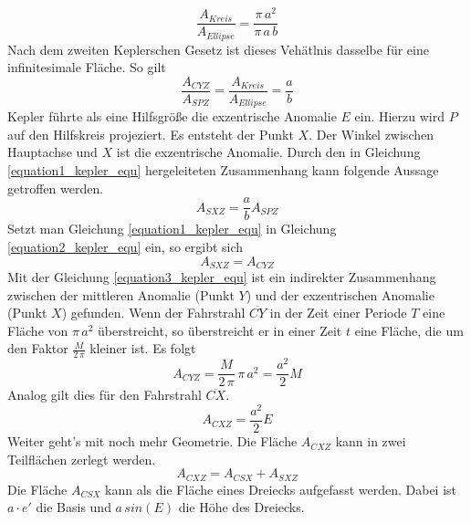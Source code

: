\begin{equation}
	\frac{A_{Kreis}}{A_{Ellipse}}=\frac{\pi\,a^2}{\pi\,a\,b}
\end{equation}
Nach dem zweiten Keplerschen Gesetz ist dieses Vehätlnis dasselbe für eine infinitesimale Fläche. So gilt
\begin{equation}
	\frac{A_{CYZ}}{A_{SPZ}}=\frac{A_{Kreis}}{A_{Ellipse}}=\frac{a}{b}
	\label{equation1_kepler_equ}
\end{equation}
\newpar
Kepler führte als eine Hilfsgröße die exzentrische Anomalie \ensuremath{E} ein. Hierzu wird \ensuremath{P} auf den Hilfskreis projeziert. Es entsteht der Punkt \ensuremath{X}. Der Winkel zwischen Hauptachse und \ensuremath{X} ist die exzentrische Anomalie. Durch den in Gleichung \ref{equation1_kepler_equ} hergeleiteten Zusammenhang kann folgende Aussage getroffen werden. 
\begin{equation}
	A_{SXZ}=\frac{a}{b}A_{SPZ}	
	\label{equation2_kepler_equ}
\end{equation}  
Setzt man Gleichung \ref{equation1_kepler_equ} in Gleichung \ref{equation2_kepler_equ} ein, so ergibt sich
\begin{equation}
	A_{SXZ}=A_{CYZ}	
	\label{equation3_kepler_equ}
\end{equation}
Mit der Gleichung \ref{equation3_kepler_equ} ist ein indirekter Zusammenhang zwischen der mittleren Anomalie (Punkt \ensuremath{Y}) und der exzentrischen Anomalie (Punkt \ensuremath{X}) gefunden. Wenn der Fahrstrahl \ensuremath{\overline{CY}} in der Zeit einer Periode \ensuremath{T} eine Fläche von \ensuremath{\pi\,a^2} überstreicht, so überstreicht er in einer Zeit \ensuremath{t} eine Fläche, die um den Faktor \ensuremath{\frac{M}{2\,\pi}} kleiner ist. Es folgt 
\begin{equation}
	A_{CYZ}=\frac{M}{2\,\pi}\,\pi\,a^2=\frac{a^2}{2}M	
	\label{equation4_kepler_equ}
\end{equation}  
Analog gilt dies für den Fahrstrahl \ensuremath{\overline{CX}}.
\begin{equation}
	A_{CXZ}=\frac{a^2}{2}E	
	\label{equation5_kepler_equ}
\end{equation}
Weiter geht's mit noch mehr Geometrie. Die Fläche \ensuremath{A_{CXZ}} kann in zwei Teilflächen zerlegt werden.
\begin{equation}
	A_{CXZ}=A_{CSX}+A_{SXZ}
	\label{equation6_kepler_equ}
\end{equation}
Die Fläche \ensuremath{A_{CSX}} kann als die Fläche eines Dreiecks aufgefasst werden. Dabei ist \ensuremath{a\cdot e'} die Basis und \ensuremath{a\,sin(E)} die Höhe des Dreiecks. 
